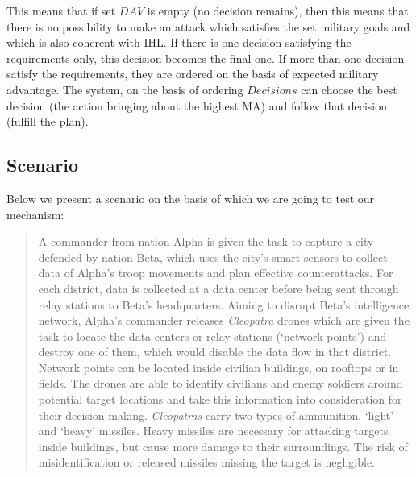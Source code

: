 This means that if set $DAV$ is empty (no decision remains), then this means that there is no possibility to make an attack which satisfies the set military goals and which is also coherent with IHL. If there is one decision satisfying the requirements only, this decision becomes the final one. If more than one decision satisfy the requirements, they are ordered on the basis of expected military advantage. 
The system, on the basis of ordering $Decisions$ can choose the best decision (the action bringing about the highest MA) and follow that decision (fulfill the plan). 




\subsection{Scenario}
\label{sec:Scenario}
Below we present a scenario on the basis of which we are going to test our mechanism:

\begin{quote}
    A commander from nation Alpha is given the task to capture a city defended by nation Beta, which uses the city’s smart sensors to collect data of Alpha’s troop movements and plan effective counterattacks. For each district, data is collected at a data center before being sent through relay stations to Beta’s headquarters. Aiming to disrupt Beta’s intelligence network, Alpha’s commander releases \textit{Cleopatra} drones which are given the task to locate the data centers or relay stations (‘network points’) and destroy one of them, which would disable the data flow in that district. Network points can be located inside civilian buildings, on rooftops or in fields. The drones are able to identify civilians and enemy soldiers around potential target locations and take this information into consideration for their decision-making. \textit{Cleopatras} carry two types of ammunition, ‘light’ and ‘heavy’ missiles. Heavy missiles are necessary for attacking targets inside buildings, but cause more damage to their surroundings. The risk of misidentification or released missiles missing the target is negligible. %
\end{quote}

